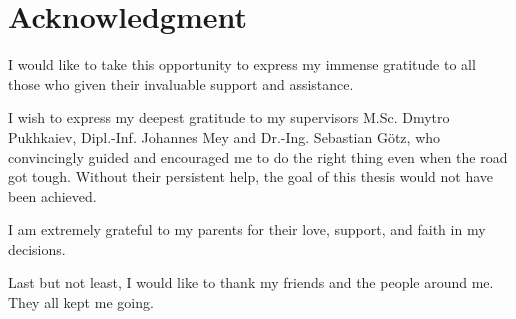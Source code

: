 \section*{Acknowledgment}
I would like to take this opportunity to express my immense gratitude to all those who given their invaluable support and assistance.

I wish to express my deepest gratitude to my supervisors M.Sc. Dmytro Pukhkaiev, Dipl.-Inf. Johannes Mey and Dr.-Ing. Sebastian Götz, who convincingly guided and encouraged me to do the right thing even when the road got tough. Without their persistent help, the goal of this thesis would not have been achieved.

I am extremely grateful to my parents for their love, support, and faith in my decisions.

Last but not least, I would like to thank my friends and the people around me. They all kept me going. 